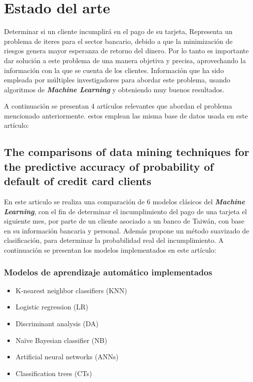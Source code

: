 \documentclass[conference]{IEEEtran}
\begin{document}
\section{Estado del arte}
Determinar si un cliente incumplirá en el pago de su tarjeta, Representa un problema de iteres para el sector bancario, debido a que la minimización de riesgos genera mayor esperanza de retorno del dinero. Por lo tanto es importante dar solución a este problema de una manera objetiva y precisa, aprovechando la información con la que se cuenta de los clientes. Información que ha sido empleada por múltiples investigadores para abordar este problema, usando algoritmos de \textit{\textbf{Machine Learning}} y obteniendo muy buenos resultados.

A continuación se presentan 4 artículos relevantes que abordan el problema mencionado anteriormente. estos emplean las misma base de datos usada en este artículo:
\subsection{The comparisons of data mining techniques for the predictive accuracy of probability of default of credit card clients }\label{AA} 
En este articulo se realiza \cite{articulo1} una comparación de 6 modelos clásicos del \textit{\textbf{Machine Learning}}, con el fin de determinar el incumplimiento del pago de una tarjeta el siguiente mes, por parte de un cliente asociado a un banco de Taiwán, con base en su información bancaria y personal. Además propone un método suavizado de clasificación, para determinar la probabilidad real del incumplimiento.
A continuación se presentan los modelos implementados en este artículo:
\hfill\\
\subsubsection{Modelos de aprendizaje automático implementados}
\begin{itemize}
\item K-nearest neighbor classifiers (KNN)
\item Logistic regression (LR)
\item Discriminant analysis (DA)
\item Naïve Bayesian classifier (NB)
\item Artificial neural networks (ANNs)
\item Classification trees (CTs)
\hfill\\
\end{itemize}
\end{document}
